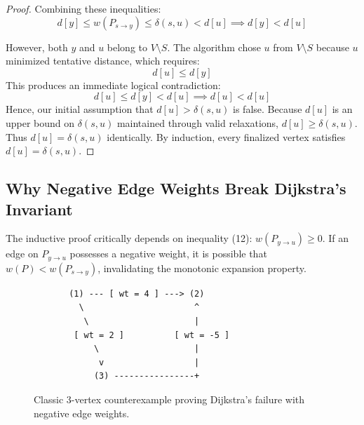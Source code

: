\documentclass[10pt,journal,compsoc,onecolumn]{IEEEtran}
\begin{document}
\begin{proof}
Combining these inequalities:
\begin{equation}
d[y] \le w(P_{s \to y}) \le \delta(s, u) < d[u] \implies d[y] < d[u]
\end{equation}

However, both $y$ and $u$ belong to $V \setminus S$. The algorithm chose $u$ from $V \setminus S$ because $u$ minimized tentative distance, which requires:
\begin{equation}
d[u] \le d[y]
\end{equation}
This produces an immediate logical contradiction:
\begin{equation}
d[u] \le d[y] < d[u] \implies d[u] < d[u]
\end{equation}
Hence, our initial assumption that $d[u] > \delta(s, u)$ is false. Because $d[u]$ is an upper bound on $\delta(s, u)$ maintained through valid relaxations, $d[u] \ge \delta(s, u)$. Thus $d[u] = \delta(s, u)$ identically. By induction, every finalized vertex satisfies $d[u] = \delta(s, u)$.
\end{proof}

\subsection{Why Negative Edge Weights Break Dijkstra's Invariant}
The inductive proof critically depends on inequality (12): $w(P_{y \to u}) \ge 0$. If an edge on $P_{y \to u}$ possesses a negative weight, it is possible that $w(P) < w(P_{s \to y})$, invalidating the monotonic expansion property.

\begin{figure}[h]
\centering
\begin{verbatim}
       (1) --- [ wt = 4 ] ---> (2)
         \                      ^
          \                     |
        [ wt = 2 ]          [ wt = -5 ]
            \                   |
             v                  |
            (3) ----------------+
\end{verbatim}
\caption{Classic 3-vertex counterexample proving Dijkstra's failure with negative edge weights.}
\label{fig:negative_weights_counterexample}
\end{figure}
\end{document}
